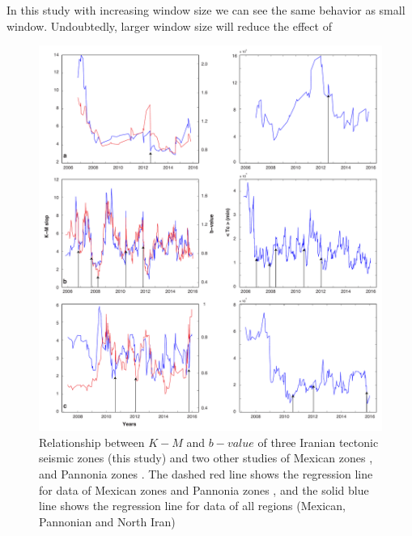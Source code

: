  In this study with increasing window size we can see the same behavior as small window. Undoubtedly, larger window size will reduce the effect of 
 
 
 
 \begin{figure} [ht]
\centering
\includegraphics[scale=0.34]{figures/pdf/Figure07.pdf} 
\caption{ Relationship between $K-M$ and $b-value$ of three Iranian tectonic seismic zones (this study) and two other studies of Mexican zones \citep{Telesca2013}, and Pannonia zones \citep{Telesca2014}. The dashed red line shows the regression line for data of  Mexican zones and Pannonia zones \citep{Telesca2014}, and the solid blue line shows the regression line for data of all regions (Mexican, Pannonian and North Iran)}
\label{fig:tc}
\end{figure}
 
 
 
 
 
 
 